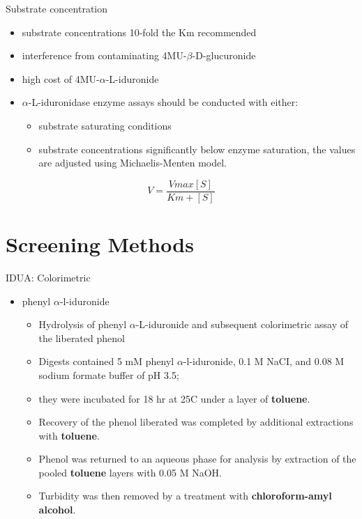 \documentclass[presentation, smaller]{beamer}
\begin{document}
\begin{frame}[label={sec:orgheadline7}]{Substrate concentration}
\begin{itemize}
\item substrate concentrations 10-fold the Km recommended
\item interference from contaminating 4MU-\(\beta\)-D-glucuronide
\item high cost of 4MU-\(\alpha\)-L-iduronide
\item \(\alpha\)-L-iduronidase enzyme assays should be conducted with either:
\begin{itemize}
\item substrate saturating conditions
\item substrate concentrations significantly below enzyme saturation,
the values are adjusted using Michaelis-Menten model.
\end{itemize}
\end{itemize}

\[ 
V  = \frac{Vmax[S]}{Km + [S]}
\]
\end{frame}

\section{Screening Methods}
\label{sec:orgheadline20}

\begin{frame}[label={sec:orgheadline9}]{IDUA: Colorimetric}
\begin{itemize}
\item phenyl \(\alpha\)-l-iduronide
\begin{itemize}
\item Hydrolysis of phenyl \(\alpha\)-L-iduronide and subsequent
colorimetric assay of the liberated phenol
\item Digests contained 5 mM phenyl \(\alpha\)-l-iduronide, 0.1 M NaCI,
and 0.08 M sodium formate buffer of pH 3.5;
\item they were incubated for 18 hr at 25\degree C under a layer of \textbf{toluene}.
\item Recovery of the phenol liberated was completed by additional extractions with \textbf{toluene}.
\item Phenol was returned to an aqueous phase for analysis by extraction of the pooled \textbf{toluene} layers with 0.05 M NaOH.
\item Turbidity was then removed by a treatment with \textbf{chloroform-amyl alcohol}.
\end{itemize}
\end{itemize}
\end{frame}
\end{document}
